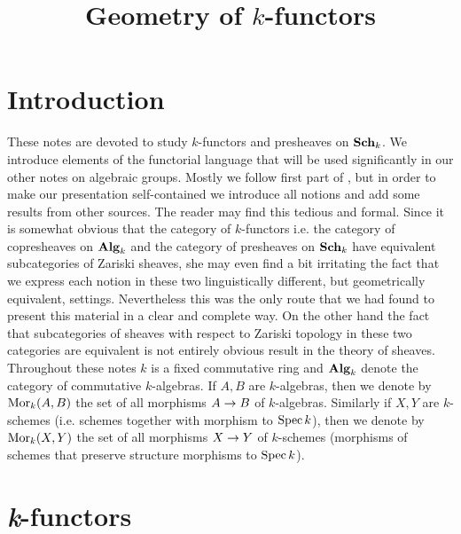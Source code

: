 



\title{Geometry of $k$-functors}
\date{}
\maketitle

\section{Introduction}
\noindent
These notes are devoted to study $k$-functors and presheaves on $\mathbf{Sch}_k$. We introduce elements of the functorial language that will be used significantly in our other notes on algebraic groups. Mostly we follow first part of \cite{demazure1970groupes}, but in order to make our presentation self-contained we introduce all notions and add some results from other sources. The reader may find this  tedious and formal. Since it is somewhat obvious that the category of $k$-functors i.e. the category of copresheaves on $\mathbf{Alg}_k$ and the category of presheaves on $\mathbf{Sch}_k$ have equivalent subcategories of Zariski sheaves, she may even find a bit irritating the fact that we express each notion in these two linguistically different, but geometrically equivalent, settings. Nevertheless this was the only route that we had found to present this material in a clear and complete way. On the other hand the fact that subcategories of sheaves with respect to Zariski topology in these two categories are equivalent is not entirely obvious result in the theory of sheaves.\\
Throughout these notes $k$ is a fixed commutative ring and $\mathbf{Alg}_k$ denote the category of commutative $k$-algebras. If $A, B$ are $k$-algebras, then we denote by $\mathrm{Mor}_k(A, B)$ the set of all morphisms $A\rightarrow B$ of $k$-algebras. Similarly if $X, Y$ are $k$-schemes (i.e. schemes together with morphism to $\mathrm{Spec}\, k$), then we denote by $\mathrm{Mor}_k(X,Y)$ the set of all morphisms $X\rightarrow Y$ of $k$-schemes (morphisms of schemes that preserve structure morphisms to $\mathrm{Spec}\, k$).

\section{\textit{k}-functors}

